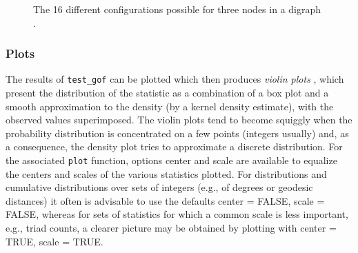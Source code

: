 \documentclass[a4paper,fleqn,11pt]{article}
\newcommand{\+}{\, + \,}
\newcommand{\sfn}[1]{\textsf{#1}}
\begin{document}
\begin{figure}[htb]
\begin{center}
\hspace{5ex}
\end{center}

\caption{The 16 different configurations possible for three nodes in a digraph
\citep[after][]{HollandLeinhardt1976}.}
\label{F_triads}
\end{figure}

\clearpage

\subsubsection{Plots}
The results of \texttt{test\_gof} can be plotted which then produces
\emph{violin plots} \citep{HintzeNelson1998}, which present
the distribution of the statistic as a combination
of a box plot and a smooth approximation to the density
(by a kernel density estimate), with the observed values superimposed.
The violin plots tend to become squiggly when the probability distribution
is concentrated on a few points (integers usually) and, as a consequence,
the density plot tries to approximate a discrete distribution.
For the associated \verb!plot! function, options \sfn{center} and \sfn{scale}
are available to equalize the centers and scales of the various statistics
plotted.
For distributions and cumulative distributions over sets of integers
(e.g., of degrees or geodesic distances)
it often is advisable to use the defaults \sfn{center = FALSE},
\sfn{scale = FALSE}, whereas for sets of statistics for which a common scale
is less important, e.g., triad counts, a clearer picture may be obtained by
plotting with \sfn{center = TRUE}, \sfn{scale = TRUE}.
\end{document}
